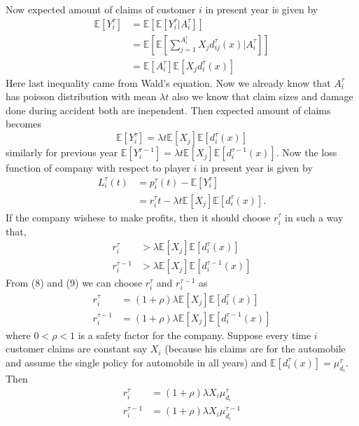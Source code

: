 \documentclass[a4paper,english,12pt]{article}
\begin{document}
Now expected amount of claims of customer $i$ in present year is given by
\begin{align*}
\mathbb{E}[Y_i^\tau]&=\mathbb{E}\left[\mathbb{E}\left[Y_i^\tau|A_i^\tau\right]\right]\\
			       &=\mathbb{E}\left[\mathbb{E}\left[\sum_{j=1}^{A_i^\tau}X_jd_{ij}^\tau(x)|A_i^\tau\right]\right]\\
			       &=\mathbb{E}\left[A_i^\tau\right]\mathbb{E}\left[X_jd_i^\tau(x)\right]
\end{align*}
Here last inequality came from Wald's equation. Now we already know that $A_i^\tau$ has poisson distribution with mean $\lambda t$ also we know that claim sizes and damage done during accident both are inependent. Then expected amount of claims becomes
\begin{equation}
\mathbb{E}[Y_i^\tau]=\lambda t \mathbb{E}\left[X_j\right]\mathbb{E}\left[d_i^\tau(x)\right]
\end{equation}
similarly for previous year $\mathbb{E}[Y_i^{\tau-1}]=\lambda t \mathbb{E}\left[X_j\right]\mathbb{E}\left[d_i^{\tau-1}(x)\right]$.
Now the loss function of company with respect to player $i$ in present year is given by
\begin{align}
L_i^\tau(t)&=p_i^\tau(t)-\mathbb{E}\left[Y_i^{\tau}\right]\\
	        &=r_i^\tau t - \lambda t \mathbb{E}\left[X_j\right]\mathbb{E}\left[d_i^\tau(x)\right].
\end{align}
If the company wishese to make profits, then it should choose $r_i^\tau$ in such a way that,
\begin{align}
r_i^\tau&>\lambda  \mathbb{E}\left[X_j\right]\mathbb{E}\left[d_i^\tau(x)\right]\\
r_i^{\tau-1}&>\lambda  \mathbb{E}\left[X_j\right]\mathbb{E}\left[d_i^{\tau-1}(x)\right]
\end{align}
From (8) and (9) we can choose $r_i^\tau$ and $r_i^{\tau-1}$ as
\begin{align}
r_i^\tau&=(1+\rho)\lambda  \mathbb{E}\left[X_j\right]\mathbb{E}\left[d_i^\tau(x)\right]\\
r_i^{\tau-1}&=(1+\rho)\lambda  \mathbb{E}\left[X_j\right]\mathbb{E}\left[d_i^{\tau-1}(x)\right]
\end{align}
where $0<\rho<1$ is a safety factor for the company.
Suppose every time $i$ customer claims are constant say $X_i$ (because his claims are for the automobile and assume the single policy for automobile in all years) and $\mathbb{E}\left[d_i^\tau(x)\right]=\mu_{d_i}^\tau$. Then 
\begin{align}
r_i^\tau&=(1+\rho)\lambda X_i\mu_{d_i}^\tau\\
r_i^{\tau-1}&=(1+\rho)\lambda  X_i\mu_{d_i}^{\tau-1}
\end{align}
\end{document}
